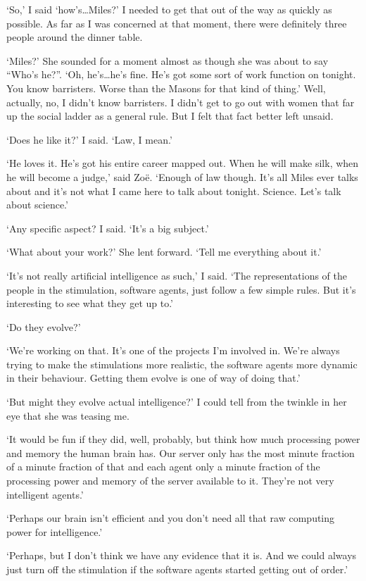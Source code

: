 `So,' I said `how's\dots Miles?' I needed to get that out
of the way as quickly as possible. As far as I was concerned at that
moment, there were definitely three people around the dinner table.

`Miles?' She sounded for a moment almost as though she was about to
say ``Who's he?''. `Oh, he's\dots he's fine. He's got some sort of
work function on tonight. You know barristers. Worse than the Masons
for that kind of thing.' Well, actually, no, I didn't know
barristers. I didn't get to go out with women that far up the social
ladder as a general rule. But I felt that fact better left unsaid.

`Does he like it?' I said. `Law, I mean.'

`He loves it. He's got his entire career mapped out. When he will
make silk, when he will become a judge,' said Zo{\"e}. `Enough of
law though. It's all Miles ever talks about and it's not what I came
here to talk about tonight. Science. Let's talk about science.'

`Any specific aspect? I said. `It's a big subject.'

`What about your work?' She lent forward. `Tell me everything about
it.'

`It's not really artificial intelligence as such,' I said. `The
representations of the people in the stimulation, software agents,
just follow a few simple rules. But it's interesting to see what
they get up to.'

`Do they evolve?'

`We're working on that. It's one of the projects I'm involved in.
We're always trying to make the stimulations more realistic, the
software agents more dynamic in their behaviour. Getting them evolve
is one of way of doing that.'

`But might they evolve actual intelligence?' I could tell from the
twinkle in her eye that she was teasing me.

`It would be fun if they did, well, probably, but think how much
processing power and memory the human brain has. Our server only has
the most minute fraction of a minute fraction of that and each agent
only a minute fraction of the processing power and memory of the
server available to it. They're not very intelligent agents.'

`Perhaps our brain isn't efficient and you don't need all that
raw computing power for intelligence.'

`Perhaps, but I don't think we have any evidence that it is. And we
could always just turn off the stimulation if the software agents
started getting out of order.'

